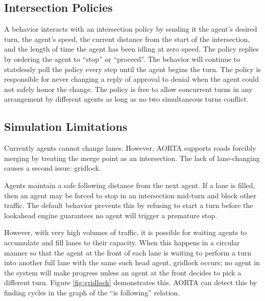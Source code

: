 \documentclass[letterpaper, 10 pt, conference]{ieeeconf}  %
\begin{document}
\subsection{Intersection Policies}

A behavior interacts with an intersection policy by sending it the agent's
desired turn, the agent's speed, the current distance from the start of the
intersection, and the length of time the agent has been idling at zero speed.
The policy replies by ordering the agent to ``stop'' or ``proceed''. The
behavior will continue to statelessly poll the policy every step until the agent
begins the turn. The policy is responsible for never changing a reply of
approval to denial when the agent could not safely honor the change. The policy
is free to allow concurrent turns in any arrangement by different agents as long
as no two simultaneous turns conflict.

\subsection{Simulation Limitations}

Currently agents cannot change lanes. However, AORTA supports roads forcibly
merging by treating the merge point as an intersection. The lack of
lane-changing causes a second issue: gridlock.

Agents maintain a safe following distance from the next agent. If a lane is
filled, then an agent may be forced to stop in an intersection mid-turn and
block other traffic. The default behavior prevents this by refusing to start a
turn before the lookahead engine guarantees no agent will trigger a premature
stop.

However, with very high volumes of traffic, it is possible for waiting agents to
accumulate and fill lanes to their capacity. When this happens in a circular
manner so that the agent at the front of each lane is waiting to perform a turn
into another full lane with the same such head agent, gridlock \cite{AAAI11-au}
occurs; no agent in the system will make progress unless an agent at the front
decides to pick a different turn. Figure \ref{fig:gridlock} demonstrates this.
AORTA can detect this by finding cycles in the graph of the ``is following''
relation.
\end{document}
